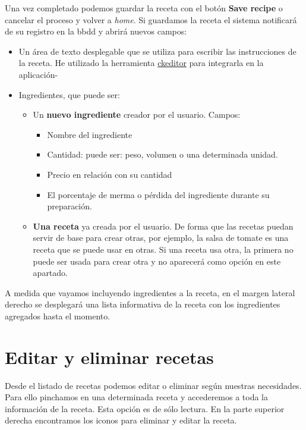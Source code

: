 Una vez completado podemos guardar la receta con el botón \textbf{Save recipe} o cancelar el proceso y volver a \emph{home}. Si guardamos la receta el sistema notificará de su registro en la bbdd y abrirá nuevos campos: 

\begin{itemize}
	\item Un área de texto desplegable que se utiliza para escribir las instrucciones de la receta. He utilizado la herramienta \href{http://ckeditor.com/}{ckeditor} para integrarla en la aplicación-
	\item Ingredientes, que puede ser:
		\begin{itemize}
			\item Un \textbf{nuevo ingrediente} creador por el usuario. Campos:
				\begin{itemize}
					\item Nombre del ingrediente
					\item Cantidad: puede ser: peso, volumen o una determinada unidad.
					\item Precio en relación con su cantidad
					\item El porcentaje de merma o pérdida del ingrediente durante su preparación.
				\end{itemize}
			\item \textbf{Una receta} ya creada por el usuario. De forma que las recetas puedan servir de base para crear otras, por ejemplo, la salsa de tomate es una receta que se puede usar en otras. Si una receta usa otra, la primera no puede ser usada para crear otra y no aparecerá como opción en este apartado.
		\end{itemize}
\end{itemize}

A medida que vayamos incluyendo ingredientes a la receta, en el margen lateral derecho se desplegará una lista informativa de la receta con los ingredientes agregados hasta el momento.

\vspace*{0.2in}
\section{Editar y eliminar recetas}\label{cap.2.3}

Desde el listado de recetas podemos editar o eliminar según nuestras necesidades. Para ello pinchamos en una determinada receta y accederemos a toda la información de la receta. Esta opción es de sólo lectura. En la parte superior derecha encontramos los iconos para eliminar y editar la receta. \\

